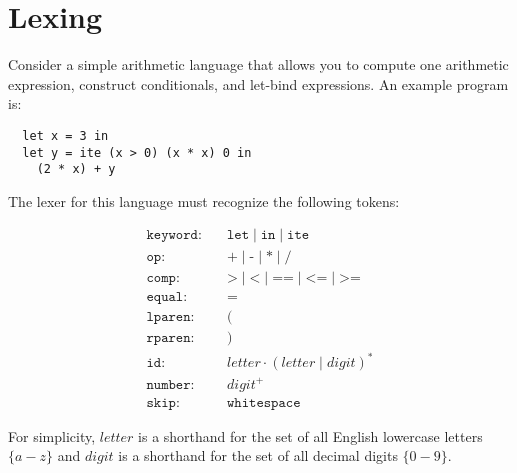 

\section{Lexing}



Consider a simple arithmetic language that allows you to compute one arithmetic
expression, construct conditionals, and let-bind expressions. An example program
is:

\begin{lstlisting}
  let x = 3 in
  let y = ite (x > 0) (x * x) 0 in
    (2 * x) + y
\end{lstlisting}

The lexer for this language must recognize the following tokens:

\begin{align*} 
 \texttt{keyword}: &\quad \texttt{let} \mid \texttt{in} \mid \texttt{ite}\\
 \texttt{op}: &\quad \texttt{+} \mid \texttt{-} \mid \texttt{*} \mid \texttt{/} \\
 \texttt{comp}: &\quad \texttt{>} \mid \texttt{<} \mid \texttt{==} \mid \texttt{<=} \mid \texttt{>=} \\
 \texttt{equal}: &\quad \texttt{=} \\
 \texttt{lparen}: &\quad \texttt{(} \\
 \texttt{rparen}: &\quad \texttt{)} \\
 \texttt{id}: &\quad letter \cdot (letter \mid digit)^* \\
 \texttt{number}: &\quad digit^+ \\
 \texttt{skip}: &\quad \texttt{whitespace} 
\end{align*}

For simplicity, \(letter\) is a shorthand for the set of all English lowercase
letters \(\{a - z\}\) and \(digit\) is a shorthand for the set of all decimal
digits \(\{0 - 9\}\). 

